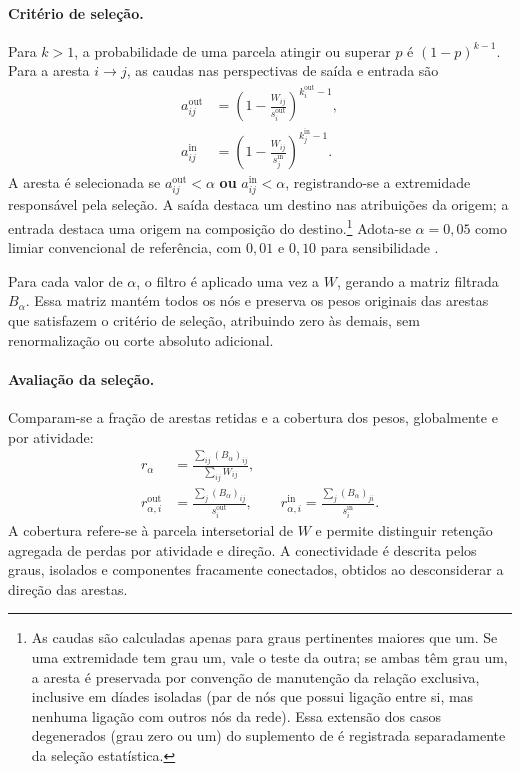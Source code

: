 \paragraph{Critério de seleção.}
Para $k>1$, a probabilidade de uma parcela atingir ou superar $p$ é $(1-p)^{k-1}$. Para a aresta $i\rightarrow j$, as caudas nas perspectivas de saída e entrada são
\begin{equation}
\begin{aligned}
a_{ij}^{\mathrm{out}}&=\left(1-\frac{W_{ij}}{s_i^{\mathrm{out}}}\right)^{k_i^{\mathrm{out}}-1},\\
a_{ij}^{\mathrm{in}}&=\left(1-\frac{W_{ij}}{s_j^{\mathrm{in}}}\right)^{k_j^{\mathrm{in}}-1}.
\end{aligned}
\label{eq:caudas-filtro}
\end{equation}
A aresta é selecionada se $a_{ij}^{\mathrm{out}}<\alpha$ \textbf{ou} $a_{ij}^{\mathrm{in}}<\alpha$, registrando-se a extremidade responsável pela seleção. A saída destaca um destino nas atribuições da origem; a entrada destaca uma origem na composição do destino.\footnote{As caudas são calculadas apenas para graus pertinentes maiores que um. Se uma extremidade tem grau um, vale o teste da outra; se ambas têm grau um, a aresta é preservada por convenção de manutenção da relação exclusiva, inclusive em díades isoladas (par de nós que possui ligação entre si, mas nenhuma ligação com outros nós da rede). Essa extensão dos casos degenerados (grau zero ou um) do suplemento de \textcite{serrano2009} é registrada separadamente da seleção estatística.} Adota-se $\alpha=0{,}05$ como limiar convencional de referência, com $0{,}01$ e $0{,}10$ para sensibilidade \parencite{serrano2009}. 

Para cada valor de $\alpha$, o filtro é aplicado uma vez a $W$, gerando a matriz filtrada $B_\alpha$. Essa matriz mantém todos os nós e preserva os pesos originais das arestas que satisfazem o critério de seleção, atribuindo zero às demais, sem renormalização ou corte absoluto adicional.

\paragraph{Avaliação da seleção.}
Comparam-se a fração de arestas retidas e a cobertura dos pesos, globalmente e por atividade:
\begin{equation}
\begin{aligned}
r_\alpha&=\frac{\sum_{ij}(B_\alpha)_{ij}}{\sum_{ij}W_{ij}},\\
r_{\alpha,i}^{\mathrm{out}}&=\frac{\sum_j(B_\alpha)_{ij}}{s_i^{\mathrm{out}}},\qquad
r_{\alpha,i}^{\mathrm{in}}=\frac{\sum_j(B_\alpha)_{ji}}{s_i^{\mathrm{in}}}.
\end{aligned}
\label{eq:cobertura-backbone}
\end{equation}
 A cobertura refere-se à parcela intersetorial de $W$ e permite distinguir retenção agregada de perdas por atividade e direção. A conectividade é descrita pelos graus, isolados e componentes fracamente conectados, obtidos ao desconsiderar a direção das arestas.

